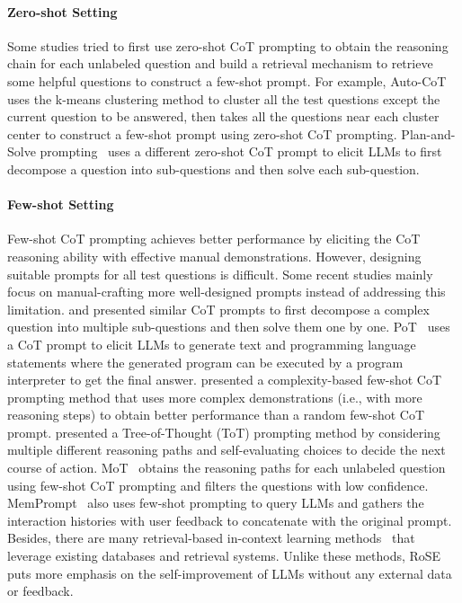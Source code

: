 \documentclass[11pt]{article}
\begin{document}
\paragraph{Zero-shot Setting} Some studies tried to first use zero-shot CoT prompting to obtain the reasoning chain for each unlabeled question and build a retrieval mechanism to retrieve some helpful questions to construct a few-shot prompt. For example, Auto-CoT~\cite{zhang2033auto-cot} uses the k-means clustering method to cluster all the test questions except the current question to be answered, then takes all the questions near each cluster center to construct a few-shot prompt using zero-shot CoT prompting. Plan-and-Solve prompting~\cite{wang2023psp} uses a different zero-shot CoT prompt to elicit LLMs to first decompose a question into sub-questions and then solve each sub-question.

\paragraph{Few-shot Setting} Few-shot CoT prompting achieves better performance by eliciting the CoT reasoning ability with effective manual demonstrations. However, designing suitable prompts for all test questions is difficult. Some recent studies mainly focus on manual-crafting more well-designed prompts instead of addressing this limitation. \citet{zhou2023ltm} and \citet{Khot2023decomp} presented similar CoT prompts to first decompose a complex question into multiple sub-questions and then solve them one by one. PoT~\cite{chen2022pot} uses a CoT prompt to elicit LLMs to generate text and programming language statements where the generated program can be executed by a program interpreter to get the final answer. \citet{fu2023complexity} presented a complexity-based few-shot CoT prompting method that uses more complex demonstrations (i.e., with more reasoning steps) to obtain better performance than a random few-shot CoT prompt. \citet{yao2023tot} presented a Tree-of-Thought (ToT) prompting method by considering multiple different reasoning paths and self-evaluating choices to decide the next course of action. MoT~\cite{li2023mot} obtains the reasoning paths for each unlabeled question using few-shot CoT prompting and filters the questions with low confidence. MemPrompt~\cite{madaan2022memprompt} also uses few-shot prompting to query LLMs and gathers the interaction histories with user feedback to concatenate with the original prompt. Besides, there are many retrieval-based in-context learning methods~\cite{luo2024icl_survey} that leverage existing databases and retrieval systems. Unlike these methods, RoSE puts more emphasis on the self-improvement of LLMs without any external data or feedback.
\end{document}
